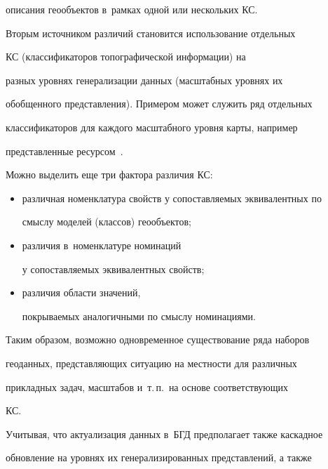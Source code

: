 описания геообъектов в~рамках одной или нескольких КС.


  


  Вторым источником различий становится использование отдельных 


КС (классификаторов топографической информации) на 


разных уровнях генерализации данных (масштабных уровнях их 


обобщенного пред\-став\-ле\-ния). Примером может служить ряд отдельных 


классификаторов для каждого масштабного уровня карты, например 


представленные ресурсом~\cite{10-nik}.


  


  Можно выделить еще три фактора различия КС: 


  \begin{itemize}


  \item 


различная номенклатура свойств у сопоставляемых эквивалентных по 


смыслу моделей (классов) геообъектов;


\item различия в~номенклатуре номинаций 


у сопоставляемых эквивалентных свойств; 


\item различия области значений, 


покрываемых аналогичными по смыслу номинациями.


\end{itemize}


  


  Таким образом, возможно одновременное существование ряда наборов 


геоданных, представляющих ситуацию на местности для различных 


прикладных задач, масштабов и~т.\,п.\ на основе соответствующих 


КС.


  


  Учитывая, что актуализация данных в~БГД предполагает также каскадное 


обновление на уровнях их генерализированных представлений, а также 


